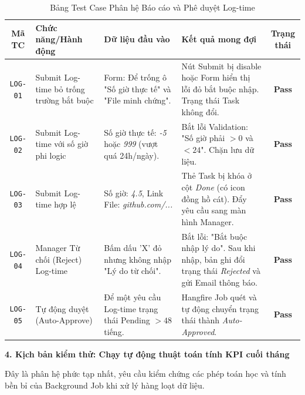 \documentclass[a4paper,13.5pt]{extreport}
\begin{document}
\begin{table}[H]
    \centering
    \renewcommand{\arraystretch}{1.4}
    \begin{tabularx}{\textwidth}{|c|p{3.5cm}|X|X|c|}
    \hline
    \textbf{Mã TC} & \textbf{Chức năng/Hành động} & \textbf{Dữ liệu đầu vào} & \textbf{Kết quả mong đợi} & \textbf{Trạng thái} \\
    \hline
    \texttt{LOG-01} & Submit Log-time bỏ trống trường bắt buộc & Form: Để trống ô "Số giờ thực tế" và "File minh chứng". & Nút Submit bị disable hoặc Form hiển thị lỗi đỏ bắt buộc nhập. Trạng thái Task không đổi. & \textbf{Pass} \\
    \hline
    \texttt{LOG-02} & Submit Log-time với số giờ phi logic & Số giờ thực tế: \textit{-5} hoặc \textit{999} (vượt quá 24h/ngày). & Bắt lỗi Validation: "Số giờ phải $> 0$ và $< 24$". Chặn lưu dữ liệu. & \textbf{Pass} \\
    \hline
    \texttt{LOG-03} & Submit Log-time hợp lệ & Số giờ: \textit{4.5}, Link File: \textit{github.com/...} & Thẻ Task bị khóa ở cột \textit{Done} (có icon đồng hồ cát). Đẩy yêu cầu sang màn hình Manager. & \textbf{Pass} \\
    \hline
    \texttt{LOG-04} & Manager Từ chối (Reject) Log-time & Bấm dấu 'X' đỏ nhưng không nhập "Lý do từ chối". & Bắt lỗi: "Bắt buộc nhập lý do". Sau khi nhập, bản ghi đổi trạng thái \textit{Rejected} và gửi Email thông báo. & \textbf{Pass} \\
    \hline
    \texttt{LOG-05} & Tự động duyệt (Auto-Approve) & Để một yêu cầu Log-time trạng thái Pending $> 48$ tiếng. & Hangfire Job quét và tự động chuyển trạng thái thành \textit{Auto-Approved}. & \textbf{Pass} \\
    \hline
    \end{tabularx}
    \caption{Bảng Test Case Phân hệ Báo cáo và Phê duyệt Log-time}
    \label{tab:tc_logtime}
\end{table}

\textbf{4. Kịch bản kiểm thử: Chạy tự động thuật toán tính KPI cuối tháng}

Đây là phân hệ phức tạp nhất, yêu cầu kiểm chứng các phép toán học và tính bền bỉ của Background Job khi xử lý hàng loạt dữ liệu.
\end{document}
